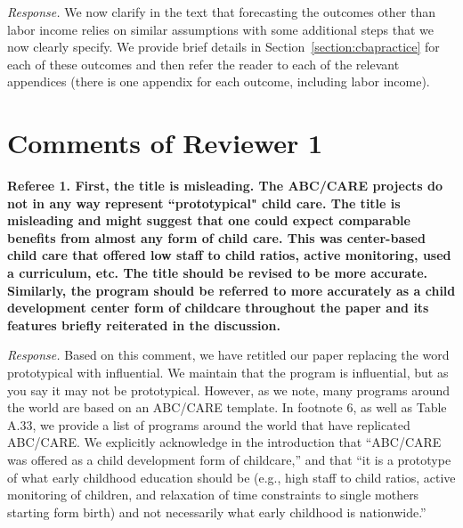 \noindent \textit{Response.} We now clarify in the text that forecasting the outcomes other than labor income relies on similar assumptions with some additional steps that we now clearly specify. We provide brief details in Section~\ref{section:cbapractice} for each of these outcomes and then refer the reader to each of the relevant appendices (there is one appendix for each outcome, including labor income).

\section*{Comments of Reviewer 1}

\noindent \textbf{Referee 1. First, the title is misleading. The ABC/CARE projects do not in any way represent ``prototypical" child care. The title is misleading and might suggest that one could expect comparable benefits from almost any form of child care. This was center-based child care that offered low staff to child ratios, active monitoring, used a curriculum, etc. The title should be revised to be more accurate. Similarly, the program should be referred to more accurately as a child development center form of childcare throughout the paper and its features briefly reiterated in the discussion.}

\noindent \textit{Response.} Based on this comment, we have retitled our paper replacing the word prototypical with influential. We maintain that the program is influential, but as you say it may not be prototypical. However, as we note, many programs around the world are based on an ABC/CARE template. In footnote 6, as well as Table A.33, we provide a list of programs around the world that have replicated ABC/CARE. We explicitly acknowledge in the introduction that ``ABC/CARE was offered as a child development form of childcare,'' and that ``it is a prototype of what early childhood education should be (e.g., high staff to child ratios, active monitoring of children, and relaxation of time constraints to single mothers starting form birth) and not necessarily what early childhood is nationwide.''

